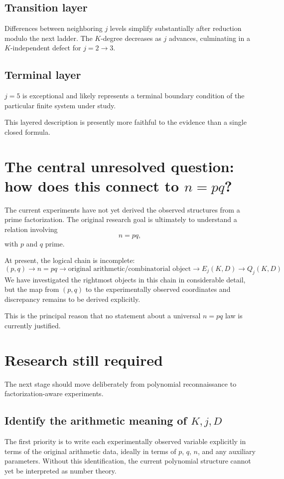 \documentclass[11pt,a4paper]{article}
\begin{document}
\subsection*{Transition layer}
Differences between neighboring $j$ levels simplify substantially after reduction modulo the next ladder. The $K$-degree decreases as $j$ advances, culminating in a $K$-independent defect for $j=2\to3$.

\subsection*{Terminal layer}
$j=5$ is exceptional and likely represents a terminal boundary condition of the particular finite system under study.

This layered description is presently more faithful to the evidence than a single closed formula.

\section{The central unresolved question: how does this connect to $n=pq$?}

The current experiments have not yet derived the observed structures from a prime factorization.
The original research goal is ultimately to understand a relation involving
\[
n=pq,
\]
with $p$ and $q$ prime.

At present, the logical chain is incomplete:
\begin{equation}
(p,q)
\longrightarrow n=pq
\longrightarrow \text{original arithmetic/combinatorial object}
\longrightarrow E_j(K,D)
\longrightarrow Q_j(K,D)
\label{eq:missingbridge}
\end{equation}
We have investigated the rightmost objects in this chain in considerable detail, but the map from $(p,q)$ to the experimentally observed coordinates and discrepancy remains to be derived explicitly.

This is the principal reason that no statement about a universal $n=pq$ law is currently justified.

\section{Research still required}

The next stage should move deliberately from polynomial reconnaissance to factorization-aware experiments.

\subsection{Identify the arithmetic meaning of $K,j,D$}
The first priority is to write each experimentally observed variable explicitly in terms of the original arithmetic data, ideally in terms of $p$, $q$, $n$, and any auxiliary parameters. Without this identification, the current polynomial structure cannot yet be interpreted as number theory.
\end{document}
